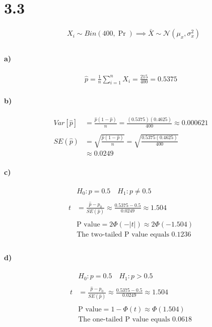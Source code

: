 \documentclass[letterpaper,12pt,titlepage,oneside,final]{book}
\begin{document}





\section*{3.3}

\begin{align*}
&X_i\sim Bin(400,\Pr) \implies \bar{X}\sim \mathcal{N}(\mu_x,\sigma^2_x)\\
\end{align*}
\paragraph{a)}
\begin{align*}
\hat{p} = \frac{1}{n}\sum_{i=1}^nX_i = \frac{215}{400} = 0.5375
\end{align*}
\paragraph{b)}
\begin{align*}
Var[\hat{p}]&=\frac{\hat{p}(1-\hat{p})}{n}
= \frac{(0.5375)(0.4625)}{400} \approx 0.000621\\
\\
SE(\hat{p}) &= \sqrt{\frac{\hat{p}(1-\hat{p})}{n}} = \sqrt{\frac{0.5375(0.4625)}{400}}\\
&\approx 0.0249
\end{align*}
\paragraph{c)}
\begin{align*}
&H_0: p =0.5 \quad H_1: p\neq 0.5\\
\\
t& = \frac{\hat{p}-p_0}{SE(\hat{p})}
\approx\frac{0.5375-0.5}{0.0249}\approx 1.504\\
\\
&\text{P value} =2\Phi(-|t|) \approx 2\Phi(-1.504)\\
&\text{The two-tailed P value equals 0.1236}\\
\end{align*}
\paragraph{d)}
\begin{align*}
&H_0: p =0.5 \quad H_1: p> 0.5\\
\\
t& = \frac{\hat{p}-p_0}{SE(\hat{p})}
\approx\frac{0.5375-0.5}{0.0249}\approx 1.504\\
\\
&\text{P value} =1 -\Phi(t) \approx \Phi(1.504)\\
&\text{The one-tailed P value equals 0.0618}\\
\end{align*}
\end{document}
